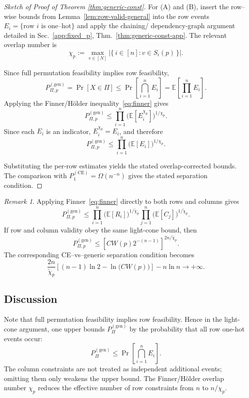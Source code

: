 \documentclass[a4paper,onecolumn,11pt,unpublished]{quantumarticle}
\theoremstyle{remark}
\newtheorem{remark}[theorem]{Remark}
\begin{document}
\begin{proof}[Sketch of Proof of Theorem \ref{thm:generic-const}]
For (A) and (B), insert the row–wise bounds from Lemma~\ref{lem:row-valid-general}
into the row events $E_i=\{\text{row $i$ is one–hot}\}$ and apply the chaining/
dependency-graph argument detailed in Sec.~\ref{app:fixed_p},
Thm.~\ref{thm:generic-const-app}. The relevant overlap number is
\[
  \chi_p
  :=
  \max_{v\in[N]}
  \left|\{\,i\in[n]: v\in S_i(p)\,\}\right|.
\]

Since full permutation feasibility implies row feasibility,
\[
  P_{\Pi,p}^{(\mathrm{gen})}
  =
  \Pr[X\in\Pi]
  \le
  \Pr\!\left[\bigcap_{i=1}^n E_i\right]
  =
  \mathbb E\!\left[\prod_{i=1}^n E_i\right].
\]
Applying the Finner/Hölder inequality~\eqref{eq:finner} gives
\[
  P_{\Pi,p}^{(\mathrm{gen})}
  \le
  \prod_{i=1}^n
  \bigl(\mathbb E[E_i^{\chi_p}]\bigr)^{1/\chi_p}.
\]
Since each \(E_i\) is an indicator, \(E_i^{\chi_p}=E_i\), and therefore
\[
  P_{\Pi,p}^{(\mathrm{gen})}
  \le
  \prod_{i=1}^n
  \bigl(\mathbb E[E_i]\bigr)^{1/\chi_p}.
\]

Substituting the per-row estimates yields the stated overlap-corrected bounds. The comparison with $P_{1}^{\mathrm{(CE)}}=\Omega(n^{-n})$ gives the stated
separation condition.
\end{proof}


\begin{remark}
Applying Finner~\eqref{eq:finner} directly to both rows and columns gives
\[
  P_{\Pi,p}^{(\mathrm{gen})}
  \le
  \prod_{i=1}^n
  \bigl(\mathbb E[R_i]\bigr)^{1/\widetilde\chi_p}
  \prod_{j=1}^n
  \bigl(\mathbb E[C_j]\bigr)^{1/\widetilde\chi_p}.
\]
If row and column validity obey the same light-cone bound, then
\[
  P_{\Pi,p}^{(\mathrm{gen})}
  \le
  \left[
    C W(p)2^{-(n-1)}
  \right]^{2n/\widetilde\chi_p}.
\]
The corresponding CE--vs--generic separation condition becomes
\[
  \frac{2n}{\widetilde\chi_p}
  \left[
    (n-1)\ln 2-\ln\!\bigl(CW(p)\bigr)
  \right]
  -
  n\ln n
  \to +\infty.
\]
\end{remark}



\subsection{Discussion}
Note that full permutation feasibility implies row feasibility.  Hence in the light-cone argument, one upper bounds \(P_\Pi^{(\mathrm{gen})}\) by the probability that all row one-hot events occur:
\[
  P_\Pi^{(\mathrm{gen})}
  \le
  \Pr\!\left[\bigcap_{i=1}^n E_i\right].
\]
The column constraints are not treated as independent additional events;
omitting them only weakens the upper bound.  The Finner/Hölder overlap
number \(\chi_p\) reduces the effective number of row constraints from \(n\)
to \(n/\chi_p\).
\end{document}
